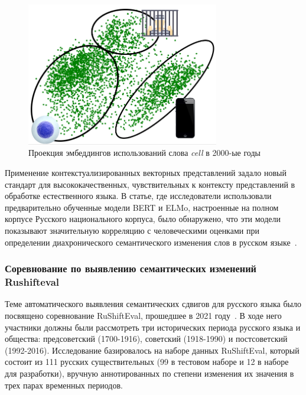 \documentclass[LI,VKR]{HSEUniversity}
\begin{document}
\begin{figure}[H]
	\centering
	\includegraphics[width=0.75\textwidth]{img/theory/cell_projection_2000_photoshop}
	\caption{Проекция эмбеддингов использований слова \textit{cell} в 2000-ые годы}
	\label{fig:Контекстуальные вложения}
\end{figure}

Применение контекстуализированных векторных представлений задало новый стандарт для
высококачественных, чувствительных к контексту представлений в обработке естественного языка.
В статье, где исследователи использовали предварительно обученные модели BERT и ELMo,
настроенные на полном корпусе Русского национального корпуса, было обнаружено,
что эти модели показывают значительную корреляцию с человеческими оценками
при определении диахронического семантического изменения слов в русском языке~\cite{rodina2020elmo}.

\subsubsection*{Соревнование по выявлению семантических изменений Rushifteval}

Теме автоматического выявления семантических сдвигов для русского языка
было посвящено соревнование RuShiftEval, прошедшее в 2021 году~\cite{rushifteval}.
В ходе него участники должны были рассмотреть три исторических периода русского языка и общества:
предсоветский (1700-1916), советский (1918-1990) и постсоветский (1992-2016).
Исследование базировалось на наборе данных RuShiftEval, который состоит из
111 русских существительных (99 в тестовом наборе и 12 в наборе для разработки),
вручную аннотированных по степени изменения их значения в трех парах временных периодов.
\end{document}
